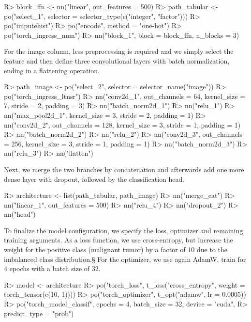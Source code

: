 \documentclass[article, nojss]{jss}
\theoremstyle{definition}
\begin{document}
\begin{CodeInput}
R> block_ffn <- nn("linear", out_features = 500) %
R> path_tabular <- po("select_1", selector = selector_type(c("integer", "factor"))) %
R>   po("imputehist") %
R>   po("encode", method = "one-hot") %
R>   po("torch_ingress_num") %
R>   nn("block_1", block = block_ffn, n_blocks = 3)
\end{CodeInput}

For the image column, less preprocessing is required and we simply select the feature and then define three convolutional layers with batch normalization, ending in a flattening operation.

\begin{CodeInput}
R> path_image <- po("select_2", selector = selector_name("image")) %
R>   po("torch_ingress_ltnsr") %
R>   nn("conv2d_1", out_channels = 64, kernel_size = 7, stride = 2, padding = 3) %
R>   nn("batch_norm2d_1") %
R>   nn("relu_1") %
R>   nn("max_pool2d_1", kernel_size = 3, stride = 2, padding = 1) %
R>   nn("conv2d_2", out_channels = 128, kernel_size = 3, stride = 1, padding = 1) %
R>   nn("batch_norm2d_2") %
R>   nn("relu_2") %
R>   nn("conv2d_3", out_channels = 256, kernel_size = 3, stride = 1, padding = 1) %
R>   nn("batch_norm2d_3") %
R>   nn("relu_3") %
R>   nn("flatten")
\end{CodeInput}

Next, we merge the two branches by concatenation and afterwards add one more dense layer with dropout, followed by the classification head.

\begin{CodeInput}
R> architecture <- list(path_tabular, path_image) %
R>   nn("merge_cat") %
R>   nn("linear_1", out_features = 500) %
R>   nn("relu_4") %
R>   nn("dropout_2") %
R>   nn("head")
\end{CodeInput}

To finalize the model configuration, we specify the loss, optimizer and remaining training arguments.
As a loss function, we use cross-entropy, but increase the weight for the positive class (malignant tumor) by a factor of 10 due to the imbalanced class distribution.§
For the optimizer, we use again AdamW, train for 4 epochs with a batch size of $32$.

\begin{CodeInput}
R> model <- architecture %
R>   po("torch_loss", t_loss("cross_entropy", weight = torch_tensor(c(10, 1)))) %
R>   po("torch_optimizer", t_opt("adamw", lr = 0.0005)) %
R>   po("torch_model_classif", epochs = 4, batch_size = 32, device = "cuda",
R>     predict_type = "prob")
\end{CodeInput}
\end{document}
